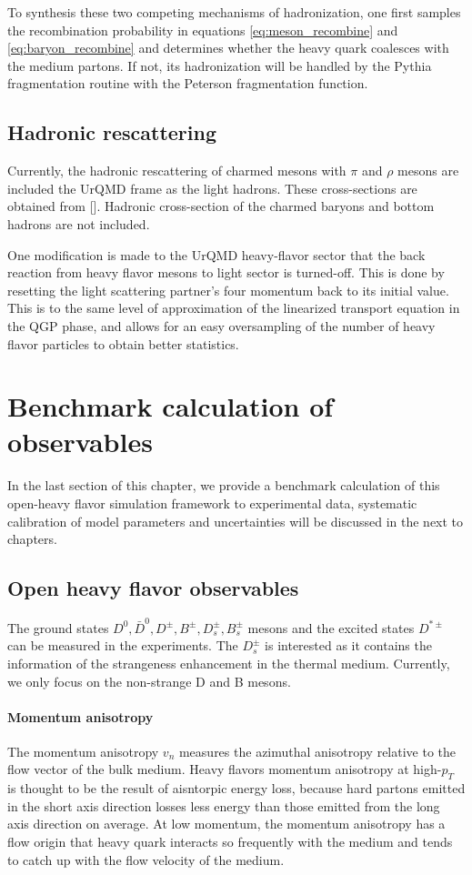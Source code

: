 To synthesis these two competing mechanisms of hadronization, one first samples the recombination probability in equations \ref{eq:meson_recombine} and \ref{eq:baryon_recombine} and determines whether the heavy quark coalesces with the medium partons. 
If not, its hadronization will be handled by the Pythia fragmentation routine with the Peterson fragmentation function.

\subsection{Hadronic rescattering}
Currently, the hadronic rescattering of charmed mesons with $\pi$ and $\rho$ mesons are included the UrQMD frame as the light hadrons. 
These cross-sections are obtained from [].
Hadronic cross-section of the charmed baryons and bottom hadrons are not included.

One modification is made to the UrQMD heavy-flavor sector that the back reaction from heavy flavor mesons to light sector is turned-off. 
This is done by resetting the light scattering partner's four momentum back to its initial value.
This is to the same level of approximation of the linearized transport equation in the QGP phase, and allows for an easy oversampling of the number of heavy flavor particles to obtain better statistics.

\section{Benchmark calculation of observables}
In the last section of this chapter, we provide a benchmark calculation of this open-heavy flavor simulation framework to experimental data, systematic calibration of model parameters and uncertainties will be discussed in the next to chapters.

\subsection{Open heavy flavor observables}
The ground states $D^0, \bar{D}^0, D^{\pm}, B^{\pm}, D_s^{\pm}, B_s^{\pm}$ mesons and the excited states $D^{*\pm}$ can be measured in the experiments.
The $D_s^{\pm}$ is interested as it contains the information of the strangeness enhancement in the thermal medium.
Currently, we only focus on the non-strange D and B mesons.

\paragraph{Momentum anisotropy}
The momentum anisotropy $v_n$ measures the azimuthal anisotropy relative to the flow vector of the bulk medium.
Heavy flavors momentum anisotropy at high-$p_T$ is thought to be the result of aisntorpic energy loss, because hard partons emitted in the short axis direction losses less energy than those emitted from the long axis direction on average.
At low momentum, the momentum anisotropy has a flow origin that heavy quark interacts so frequently with the medium and tends to catch up with the flow velocity of the medium.


